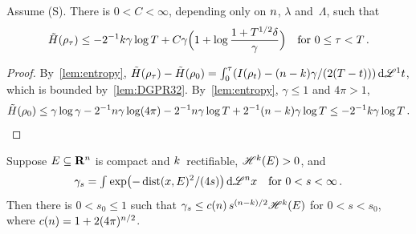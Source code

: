 \documentclass[a4paper,twoside,leqno]{article}
\begin{document}
\begin{lemma}
    \label{lem:upper_entropy}
    Assume (S). There is $0 < C < \infty$, depending only on $n$, $\lambda$ and~$\Lambda$,
    such that
    \begin{displaymath}
        \tilde H(\rho_\tau) \le - 2^{-1} k \gamma \log T + C \gamma \Bigl( 1 + \log \frac{1 +
        T^{1/2} \delta}{\gamma} \Bigr)
        \quad \text{for $0 \le \tau < T$} \,.
    \end{displaymath}
\end{lemma}

\begin{proof}
    By~\ref{lem:entropy}, $\tilde H(\rho_\tau) - \tilde H(\rho_0) = \int_0^\tau ( I(\rho_t) -
    (n - k) \gamma / (2(T-t)) ) \,\mathrm{d} \mathscr{L}^1 t$, which is bounded by~\ref{lem:DGPR32}.
    By~\ref{lem:entropy}, $\gamma \le 1$ and $4 \pi > 1$,
    \begin{displaymath}
        \tilde H(\rho_0) \le \gamma \log \gamma - 2^{-1} n \gamma \log(4 \pi) - 2^{-1} n
        \gamma \log T + 2^{-1} (n - k) \gamma \log T \le - 2^{-1} k \gamma \log T \,.
        \qedhere
    \end{displaymath}
\end{proof}

\begin{lemma}
    \label{lem:tube}
    Suppose $E \subseteq \mathbf{R}^{n}$ is compact and $k$~rectifiable, $\mathscr{H}^{k}(E) > 0$,
    and
    \begin{displaymath}
        \gamma_s = {\textstyle\int_{}^{}} \exp \bigl( - \operatorname{dist}(x,E)^2 / (4s) \bigr) \,\mathrm{d} \mathscr{L}^{n} x
        \quad \text{for $0 < s < \infty$} \,.
    \end{displaymath}
    Then there is $0 < s_0 \le 1$ such that $\gamma_s \le c(n) \, s^{(n - k)/2}
    \mathscr{H}^{k}(E)$ for $0 < s < s_0$, where $c(n) = 1 + 2 (4 \pi)^{n/2}$.
\end{lemma}
\end{document}
